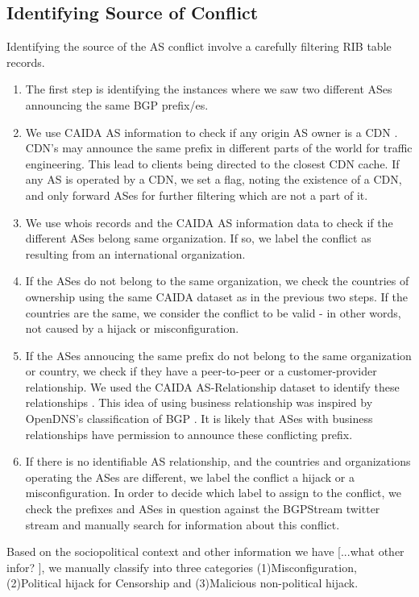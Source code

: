 \subsection{Identifying Source of Conflict}
Identifying the source of the AS conflict involve a carefully filtering RIB table records. 
\begin{enumerate}
\item The first step is identifying the instances where we saw two different ASes announcing the same BGP prefix/es.
\item We use CAIDA AS information to check if any origin AS owner is a CDN \cite{mapping}. CDN's may announce the same prefix in different parts of the world for traffic engineering. This lead to clients being directed to the closest CDN cache. If any AS is operated by a CDN, we set a flag, noting the existence of a CDN, and only forward ASes for further filtering which are not a part of it. 
\item We use whois records and the CAIDA AS information data  to check if the different ASes belong same organization. If so, we label the conflict as resulting from an international organization.
\item If the ASes do not belong to the same organization, we check the countries of ownership using the same CAIDA dataset as in the previous two steps. If the countries are the same, we consider the conflict to be valid - in other words, not caused by a hijack or misconfiguration.
\item If the ASes annoucing the same prefix do not belong to the same organization or country, we check if they have a peer-to-peer or a customer-provider relationship. We used the CAIDA AS-Relationship dataset to identify these relationships \cite{relation}. This idea of using business relationship was inspired by OpenDNS's classification of BGP \cite{opendns_blackhat_2015}. It is likely that ASes with business relationships have permission to announce these conflicting prefix. 
\item If there is no identifiable AS relationship, and the countries and organizations operating the ASes are different, we label the conflict a hijack or a misconfiguration. In order to decide which label to assign to the conflict, we check the prefixes and ASes in question against the BGPStream twitter stream and manually search for information about this conflict.
\end{enumerate}

Based on the sociopolitical context and other information we have [...what other infor? ], we manually classify into three categories (1)Misconfiguration, (2)Political hijack for Censorship and (3)Malicious non-political hijack. 

